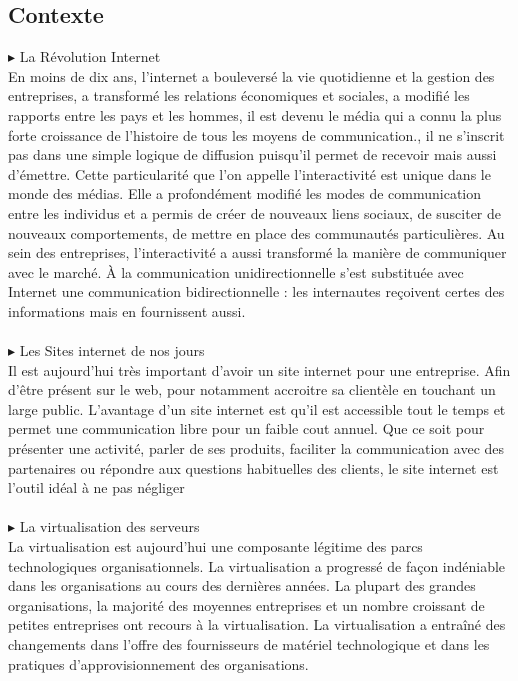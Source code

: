 \documentclass[a4paper, 12pt]{report}
\begin{document}
\subsection{Contexte} 
\noindent $\blacktriangleright$ La Révolution Internet
\\
\noindent En moins de dix ans, l’internet a bouleversé la vie quotidienne et la gestion des entreprises, a transformé les relations économiques et sociales, a modifié les rapports entre les pays et les hommes, il est devenu le média qui a connu la plus forte croissance de l’histoire de tous les moyens de communication., il ne s’inscrit pas dans une simple logique de diffusion puisqu’il permet de recevoir mais aussi d’émettre. Cette particularité que l’on appelle l’interactivité est unique dans le monde des médias. Elle a profondément modifié les modes de communication entre les individus et a permis de créer de nouveaux liens sociaux, de susciter de nouveaux comportements, de mettre en place des communautés particulières. Au sein des entreprises, l’interactivité a aussi transformé la manière de communiquer avec le marché. À la communication unidirectionnelle s’est substituée avec Internet une communication bidirectionnelle : les internautes reçoivent certes des informations mais en fournissent aussi.  
\\
\\
\noindent $\blacktriangleright$ Les Sites internet de nos jours
\\
\noindent Il est aujourd’hui très important d’avoir un site internet pour une entreprise. Afin d’être présent sur le web, pour notamment accroitre sa clientèle en touchant un large public. L’avantage d’un site internet est qu’il est accessible tout le temps et permet une communication libre pour un faible cout annuel. Que ce soit pour présenter une activité, parler de ses produits, faciliter la communication avec des partenaires ou répondre aux questions habituelles des clients, le site internet est l’outil idéal à ne pas négliger
\\
\\
$\blacktriangleright$ \noindent La virtualisation des serveurs    
\\
\noindent La virtualisation est aujourd’hui une composante légitime des parcs technologiques organisationnels. La virtualisation a progressé de façon indéniable dans les organisations au cours des dernières années. La plupart des grandes organisations, la majorité des moyennes entreprises et un nombre croissant de petites entreprises ont recours à la virtualisation.                                            La virtualisation a entraîné des changements dans l’offre des fournisseurs de matériel technologique et dans les pratiques d’approvisionnement des organisations.
\end{document}
